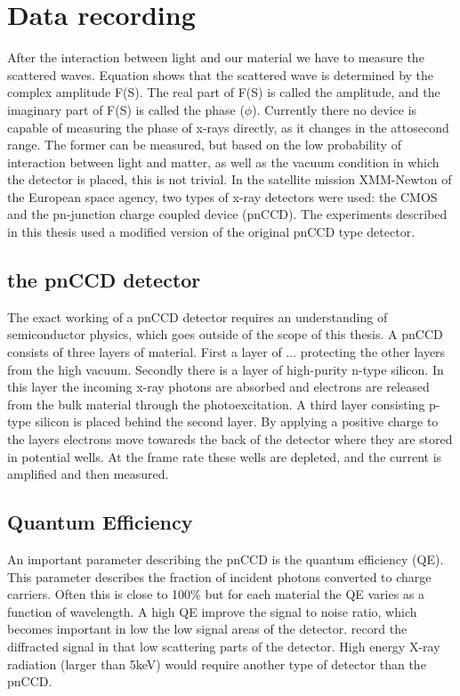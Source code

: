 \chapter{Data recording}
After the interaction between light and our material we have to measure the scattered waves. Equation shows that the scattered wave is determined by the complex amplitude F(S). The real part of F(S) is called the amplitude, and the imaginary part of F(S) is called the phase ($\phi$). Currently there no device is capable of measuring the phase of x-rays directly, as it changes in the attosecond range. The former can be measured, but based on the low probability of interaction between light and matter, as well as the vacuum condition in which the detector is placed, this is not trivial. In the satellite mission XMM-Newton of the European space agency, two types of x-ray detectors were used: the CMOS and the pn-junction charge coupled device (pnCCD). The experiments described in this thesis used a modified version of the original pnCCD type detector. 

\section{the pnCCD detector}\label{sec:pnccd}
The exact working of a pnCCD detector requires an understanding
of semiconductor physics, which goes outside of the scope of this
thesis. A pnCCD consists of three layers of material. First a layer of ...
protecting the other layers from the high vacuum. Secondly there is a layer
of high-purity n-type silicon. In this layer the incoming x-ray
photons are absorbed and
electrons are released from the bulk material through the photoexcitation. A third layer consisting
p-type silicon is placed behind the second layer. By applying a
positive charge to the layers electrons move towareds the back of the
detector where they are stored in potential wells. At the frame rate
these wells are depleted, and the current is amplified and then measured. 
   
\section{Quantum Efficiency}
An important parameter describing the pnCCD is the quantum
efficiency (QE). This parameter describes the fraction of incident photons 
converted to charge carriers. Often this is close to 100\% but for
each material the QE varies as a function of wavelength. A high QE
improve the signal to noise ratio, which becomes important in low the
low signal areas of the detector.
record the diffracted signal in that low scattering parts of the detector. High energy X-ray radiation
(larger than 5keV) would require another type of detector than the pnCCD. 

